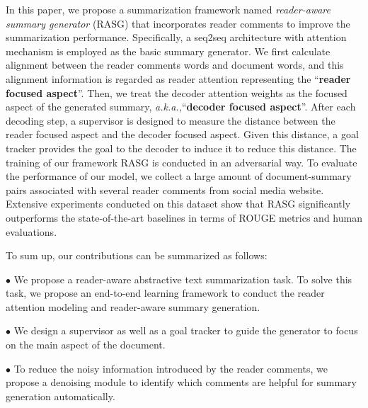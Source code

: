 \documentclass[letterpaper]{article} %
\newcommand{\aka}{\emph{a.k.a.,}\xspace}
\begin{document}
In this paper, we propose a summarization framework named \emph{reader-aware summary generator} (RASG) that incorporates reader comments to improve the summarization performance.
Specifically, a seq2seq architecture with attention mechanism is employed as the basic summary generator.
We first calculate alignment between the reader comments words and document words, and this alignment information is regarded as reader attention representing the ``\textbf{reader focused aspect}''.
Then, we treat the decoder attention weights as the focused aspect of the generated summary, \aka ``\textbf{decoder focused aspect}''.
After each decoding step, a supervisor is designed to measure the distance between the reader focused aspect and the decoder focused aspect.
Given this distance, a goal tracker provides the goal to the decoder to induce it to reduce this distance.
The training of our framework RASG is conducted in an adversarial way.
To evaluate the performance of our model, we collect a large amount of document-summary pairs associated with several reader comments from social media website.
Extensive experiments conducted on this dataset show that RASG significantly outperforms the state-of-the-art baselines in terms of ROUGE metrics and human evaluations.

To sum up, our contributions can be summarized as follows:

$\bullet$ We propose a reader-aware abstractive text summarization task. To solve this task, we propose an end-to-end learning framework to conduct the reader attention modeling and reader-aware summary generation.

$\bullet$ %
We design a supervisor as well as a goal tracker to guide the generator to focus on the main aspect of the document.

$\bullet$ To reduce the noisy information introduced by the reader comments, we propose a denoising module to identify which comments are helpful for summary generation automatically.
\end{document}
